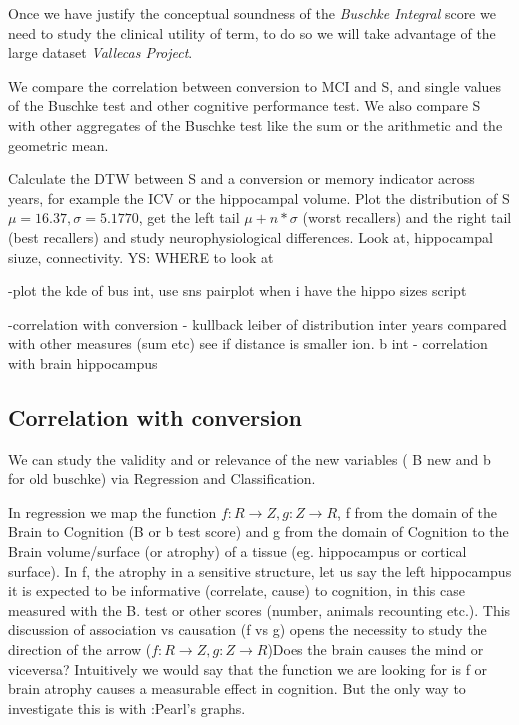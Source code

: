 \documentclass[9pt,twocolumn,twoside]{pnas-new}
\begin{document}
Once we have justify the conceptual soundness of the \emph{Buschke Integral} score we need to study the clinical utility of term, to do so we will take advantage of the large dataset \emph{Vallecas Project}.

We compare the correlation between conversion to MCI and S, and single values of the Buschke test and other cognitive performance test. We also compare S with other aggregates of the Buschke test like the sum or the arithmetic and the geometric mean.

Calculate the DTW between S and a conversion or memory indicator across years, for example the ICV or the hippocampal volume. 
Plot the distribution of S $\mu = 16.37, \sigma=5.1770$, get the left tail $\mu + n*\sigma$ (worst recallers) and the right tail (best recallers) and study neurophysiological differences. Look at, hippocampal siuze, connectivity. YS: WHERE to look at

-plot the kde of bus int, use sns pairplot when i have the hippo sizes script

-correlation with conversion
- kullback leiber of distribution inter years compared with other measures (sum etc) see if distance is smaller ion. b int
- correlation with brain hippocampus





\subsection*{Correlation with conversion}
We can study the validity and or relevance of the new variables ( B new and b for old buschke) via Regression and Classification.

In regression we map the function $f: R \to Z, g: Z \to R$, f from the  domain of the Brain to Cognition (B or b test score) and g from the domain of Cognition to the Brain volume/surface (or atrophy) of a tissue (eg. hippocampus or cortical surface). In f, the atrophy in a  sensitive structure, let us say the left hippocampus it is expected to be informative (correlate, cause) to cognition, in this case measured with the B. test or other scores (number, animals recounting etc.). This discussion of association vs causation (f vs g) opens the necessity to study the direction of the arrow ($f: R \to Z, g: Z \to R$)Does the brain causes the mind or viceversa? Intuitively we would say that the function we are looking for is f or brain atrophy causes a measurable effect in cognition. But the only way to investigate this is with :Pearl's graphs.
\end{document}
